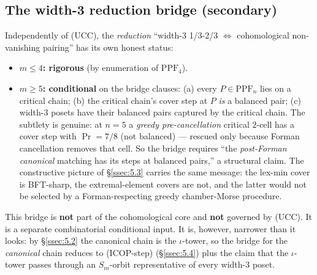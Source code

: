 \documentclass[11pt,reqno]{amsart}
\theoremstyle{plain}
\theoremstyle{definition}
\newcommand{\PPF}{\mathrm{PPF}}
\newcommand{\UCC}{\textup{(UCC)}}
\newcommand{\ICOPstep}{\textup{(ICOP-step)}}
\begin{document}
\subsection{The width-3 reduction bridge (secondary)}\label{ssec:7.3}
Independently of \UCC, the \emph{reduction} ``width-3 1/3-2/3
$\Longleftrightarrow$ cohomological non-vanishing pairing'' has its own
honest status:
\begin{itemize}[leftmargin=1.6em]
  \item \textbf{$m\le4$: rigorous} (by enumeration of $\PPF_4$).
  \item \textbf{$m\ge5$: conditional} on the bridge clauses:
        (a) every $P\in\PPF_n$ lies on a critical chain; (b) the
        critical chain's cover step at $P$ \emph{is} a balanced pair;
        (c) width-3 posets have their balanced pairs captured by the
        critical chain. The subtlety is genuine: at $n=5$ a
        \emph{greedy pre-cancellation} critical $2$-cell has a cover
        step with $\Pr=7/8$ (not balanced) --- rescued only because
        Forman cancellation removes that cell. So the bridge requires
        ``the \emph{post-Forman canonical} matching has its steps at
        balanced pairs,'' a structural claim. The constructive picture
        of \S\ref{ssec:5.3} carries the same message: the lex-min cover
        is BFT-sharp, the extremal-element covers are not, and the
        latter would not be selected by a Forman-respecting greedy
        chamber-Morse procedure.
\end{itemize}
This bridge is \textbf{not} part of the cohomological core and
\textbf{not} governed by \UCC. It is a separate combinatorial
conditional input. It is, however, narrower than it looks: by
\S\ref{ssec:5.2} the canonical chain is the $\iota$-tower, so the bridge
for the \emph{canonical} chain reduces to \ICOPstep{}
(\S\ref{ssec:5.4}) plus the claim that the $\iota$-tower passes through
an $S_m$-orbit representative of every width-3 poset.
\end{document}
